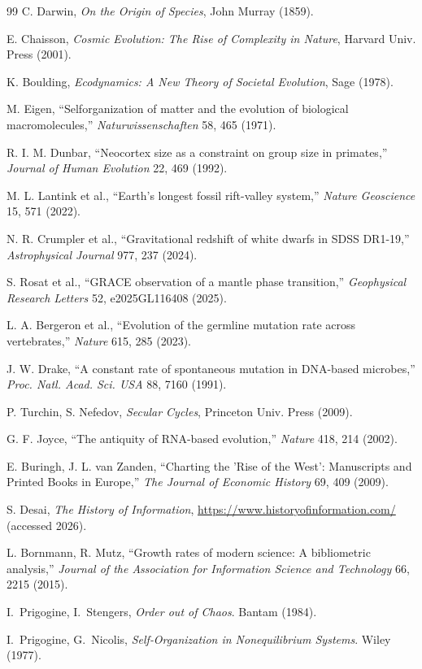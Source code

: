 \documentclass[11pt,a4paper]{article}
\begin{document}
\begin{thebibliography}{99}
		C. Darwin, \emph{On the Origin of Species}, John Murray (1859).
		
		E. Chaisson, \emph{Cosmic Evolution: The Rise of Complexity in Nature}, Harvard Univ. Press (2001).
		
		K. Boulding, \emph{Ecodynamics: A New Theory of Societal Evolution}, Sage (1978).
		
		M. Eigen, ``Selforganization of matter and the evolution of biological macromolecules,'' \emph{Naturwissenschaften} 58, 465 (1971).
		
		R. I. M. Dunbar, ``Neocortex size as a constraint on group size in primates,'' \emph{Journal of Human Evolution} 22, 469 (1992).
		
		M. L. Lantink et al., ``Earth's longest fossil rift-valley system,'' \emph{Nature Geoscience} 15, 571 (2022).
		
		N. R. Crumpler et al., ``Gravitational redshift of white dwarfs in SDSS DR1-19,'' \emph{Astrophysical Journal} 977, 237 (2024).
		
		S. Rosat et al., ``GRACE observation of a mantle phase transition,'' \emph{Geophysical Research Letters} 52, e2025GL116408 (2025).
		
		L. A. Bergeron et al., ``Evolution of the germline mutation rate across vertebrates,'' \emph{Nature} 615, 285 (2023).
		
		J. W. Drake, ``A constant rate of spontaneous mutation in DNA-based microbes,'' \textit{Proc. Natl. Acad. Sci. USA} 88, 7160 (1991).
		
		P. Turchin, S. Nefedov, \emph{Secular Cycles}, Princeton Univ. Press (2009).
		
		G. F. Joyce, ``The antiquity of RNA-based evolution,'' \textit{Nature} 418, 214 (2002).
		
		E. Buringh, J. L. van Zanden, ``Charting the 'Rise of the West': Manuscripts and Printed Books in Europe,'' \emph{The Journal of Economic History} 69, 409 (2009).
		
		S. Desai, \emph{The History of Information}, \url{https://www.historyofinformation.com/} (accessed 2026).
		
		L. Bornmann, R. Mutz, ``Growth rates of modern science: A bibliometric analysis,'' \emph{Journal of the Association for Information Science and Technology} 66, 2215 (2015).
		
		 I.~Prigogine, I.~Stengers, \emph{Order out of Chaos}. Bantam (1984).
		
		 I.~Prigogine, G.~Nicolis, \emph{Self‑Organization in Nonequilibrium Systems}. Wiley (1977).
		
	\end{thebibliography}
	
\end{document}

